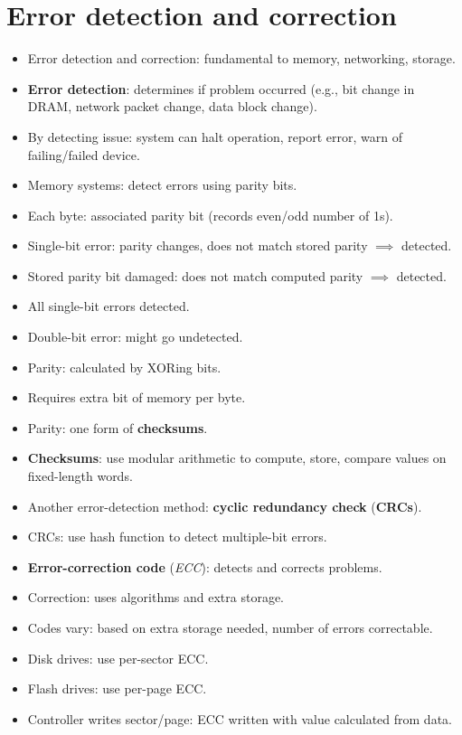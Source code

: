 \section{Error detection and correction}

\begin{itemize}
    \item Error detection and correction: fundamental to memory, networking, storage.
    \item \textbf{Error detection}: determines if problem occurred (e.g., bit change in DRAM, network packet change, data block change).
    \item By detecting issue: system can halt operation, report error, warn of failing/failed device.
    \item Memory systems: detect errors using parity bits.
    \item Each byte: associated parity bit (records even/odd number of 1s).
    \item Single-bit error: parity changes, does not match stored parity $\implies$ detected.
    \item Stored parity bit damaged: does not match computed parity $\implies$ detected.
    \item All single-bit errors detected.
    \item Double-bit error: might go undetected.
    \item Parity: calculated by XORing bits.
    \item Requires extra bit of memory per byte.
    \item Parity: one form of \textbf{checksums}.
    \item \textbf{Checksums}: use modular arithmetic to compute, store, compare values on fixed-length words.
    \item Another error-detection method: \textbf{cyclic redundancy check} (\textbf{CRCs}).
    \item CRCs: use hash function to detect multiple-bit errors.
    \item \textbf{Error-correction code} (\textit{ECC}): detects and corrects problems.
    \item Correction: uses algorithms and extra storage.
    \item Codes vary: based on extra storage needed, number of errors correctable.
    \item Disk drives: use per-sector ECC.
    \item Flash drives: use per-page ECC.
    \item Controller writes sector/page: ECC written with value calculated from data.

\end{itemize}
